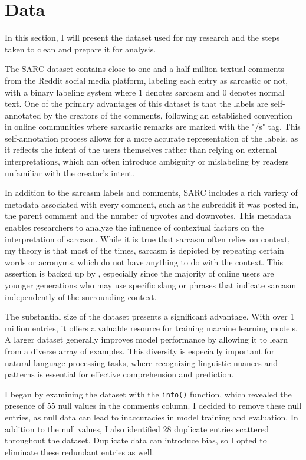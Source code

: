 \section{Data}

In this section, I will present the dataset used for my research and the steps taken to clean and prepare it for analysis.

The SARC \cite{SARC} dataset contains close to one and a half million textual comments from the Reddit social media platform, labeling each entry as sarcastic or not, with a binary 
labeling system where 1 denotes sarcasm and 0 denotes normal text. One of the primary advantages of this dataset is that the labels are self-annotated by the creators of the comments, 
following an established convention in online communities where sarcastic remarks are marked with the "/s" tag. This self-annotation process allows for a more accurate representation 
of the labels, as it reflects the intent of the users themselves rather than relying on external interpretations, which can often introduce ambiguity or mislabeling by readers unfamiliar 
with the creator's intent.

In addition to the sarcasm labels and comments, SARC includes a rich variety of metadata associated with every comment, such as the subreddit it was posted in, the parent comment and the 
number of upvotes and downvotes. This metadata enables researchers to analyze the influence of contextual factors on the interpretation of sarcasm. While it is true that sarcasm often 
relies on context, my theory is that most of the times, sarcasm is depicted by repeating certain words or acronyms, which do not have anything to do with the context. This assertion is 
backed up by \cite{Juli_2024}, especially since the majority of online users are younger generations who may use specific slang or phrases that indicate sarcasm independently of the 
surrounding context.

The substantial size of the dataset presents a significant advantage. With over 1 million entries, it offers a valuable resource for training machine learning models. A larger dataset 
generally improves model performance by allowing it to learn from a diverse array of examples. This diversity is especially important for natural language processing tasks, where 
recognizing linguistic nuances and patterns is essential for effective comprehension and prediction.

I began by examining the dataset with the \texttt{info()} function, which revealed the presence of 55 null values in the comments column. I decided to remove these null entries, as null 
data can lead to inaccuracies in model training and evaluation. In addition to the null values, I also identified 28 duplicate entries scattered throughout the dataset. Duplicate data 
can introduce bias, so I opted to eliminate these redundant entries as well.

